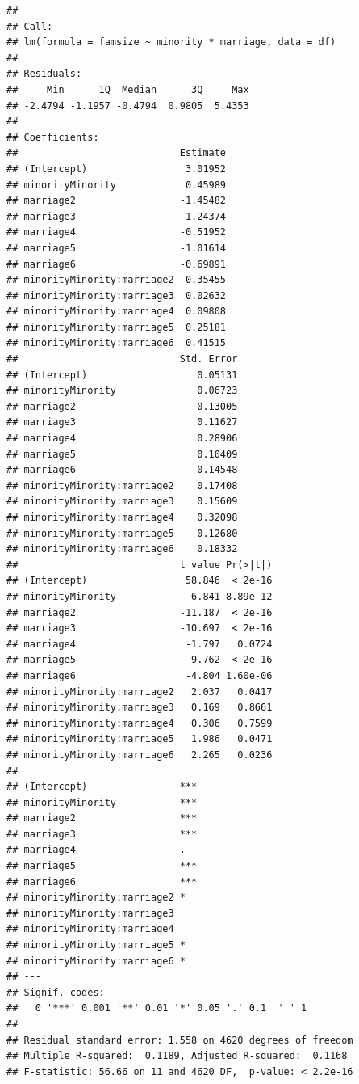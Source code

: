\documentclass[]{tufte-book}
\theoremstyle{definition}
\theoremstyle{definition}
\theoremstyle{remark}
\begin{document}
\begin{verbatim}
## 
## Call:
## lm(formula = famsize ~ minority * marriage, data = df)
## 
## Residuals:
##     Min      1Q  Median      3Q     Max 
## -2.4794 -1.1957 -0.4794  0.9805  5.4353 
## 
## Coefficients:
##                            Estimate
## (Intercept)                 3.01952
## minorityMinority            0.45989
## marriage2                  -1.45482
## marriage3                  -1.24374
## marriage4                  -0.51952
## marriage5                  -1.01614
## marriage6                  -0.69891
## minorityMinority:marriage2  0.35455
## minorityMinority:marriage3  0.02632
## minorityMinority:marriage4  0.09808
## minorityMinority:marriage5  0.25181
## minorityMinority:marriage6  0.41515
##                            Std. Error
## (Intercept)                   0.05131
## minorityMinority              0.06723
## marriage2                     0.13005
## marriage3                     0.11627
## marriage4                     0.28906
## marriage5                     0.10409
## marriage6                     0.14548
## minorityMinority:marriage2    0.17408
## minorityMinority:marriage3    0.15609
## minorityMinority:marriage4    0.32098
## minorityMinority:marriage5    0.12680
## minorityMinority:marriage6    0.18332
##                            t value Pr(>|t|)
## (Intercept)                 58.846  < 2e-16
## minorityMinority             6.841 8.89e-12
## marriage2                  -11.187  < 2e-16
## marriage3                  -10.697  < 2e-16
## marriage4                   -1.797   0.0724
## marriage5                   -9.762  < 2e-16
## marriage6                   -4.804 1.60e-06
## minorityMinority:marriage2   2.037   0.0417
## minorityMinority:marriage3   0.169   0.8661
## minorityMinority:marriage4   0.306   0.7599
## minorityMinority:marriage5   1.986   0.0471
## minorityMinority:marriage6   2.265   0.0236
##                               
## (Intercept)                ***
## minorityMinority           ***
## marriage2                  ***
## marriage3                  ***
## marriage4                  .  
## marriage5                  ***
## marriage6                  ***
## minorityMinority:marriage2 *  
## minorityMinority:marriage3    
## minorityMinority:marriage4    
## minorityMinority:marriage5 *  
## minorityMinority:marriage6 *  
## ---
## Signif. codes:  
##   0 '***' 0.001 '**' 0.01 '*' 0.05 '.' 0.1  ' ' 1
## 
## Residual standard error: 1.558 on 4620 degrees of freedom
## Multiple R-squared:  0.1189, Adjusted R-squared:  0.1168 
## F-statistic: 56.66 on 11 and 4620 DF,  p-value: < 2.2e-16
\end{verbatim}
\end{document}
